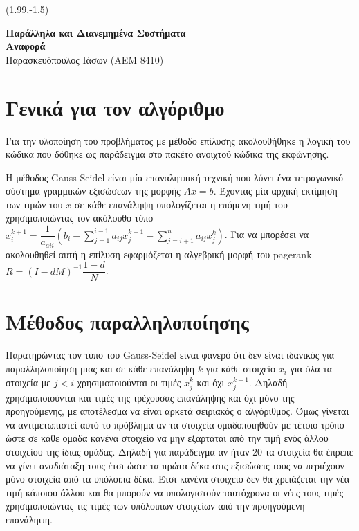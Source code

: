 \documentclass[10p]{report}
\begin{document}
\begin{textblock}{7.5}(1.99,-1.5)	
\begin{center}
\textbf{\Large{Παράλληλα και Διανεμημένα Συστήματα}}\\
\textbf{\large{Αναφορά }} \\
\normalsize{Παρασκευόπουλος Ιάσων (ΑΕΜ 8410)}
\end{center}
\end{textblock}

\section*{Γενικά για τον αλγόριθμο}

Για την υλοποίηση του προβλήματος  με μέθοδο επίλυσης 
ακολουθήθηκε η λογική του κώδικα που δόθηκε ως παράδειγμα στο πακέτο ανοιχτού
κώδικα της εκφώνησης. 

Η μέθοδος Gauss-Seidel είναι μία επαναλητπική τεχνική που λύνει ένα τετραγωνικό
σύστημα γραμμικών εξισώσεων της μορφής $ Ax=b $. Έχοντας μία αρχική εκτίμηση των τιμών
του $ x $ σε κάθε επανάληψη υπολογίζεται η επόμενη τιμή του χρησιμοποιώντας τον
ακόλουθο τύπο $ x_i^{k+1} = \dfrac{1}{a_{aii}}(b_i - \sum_{j=1}^{i-1} a_{ij}x_j^{k+1} - \sum_{j=i+1}^{n} a_{ij}x_j^k)$.
Για να μπορέσει να ακολουθηθεί αυτή η επίλυση
εφαρμόζεται η αλγεβρική μορφή του pagerank $ R = (I - dM)^{-1}\dfrac{1-d}{N} $. 

\section*{Μέθοδος παραλληλοποίησης}

Παρατηρώντας τον τύπο του Gauss-Seidel είναι φανερό ότι δεν είναι ιδανικός για
παραλληλοποίηση μιας και σε κάθε επανάληψη $ k $ για κάθε στοιχείο $ x_i $ για όλα τα
στοιχεία με $ j < i $ χρησιμοποιούνται οι τιμές $ x_j^{k}$ και όχι $ x_j^{k-1}$.
Δηλαδή χρησιμοποιούνται και τιμές της τρέχουσας επανάληψης και όχι μόνο της προηγούμενης, με αποτέλεσμα
να είναι αρκετά σειριακός ο αλγόριθμος. Όμως γίνεται να αντιμετωπιστεί αυτό το
πρόβλημα αν τα στοιχεία ομαδοποιηθούν με τέτοιο τρόπο ώστε σε κάθε ομάδα κανένα
στοιχείο να μην εξαρτάται από την τιμή ενός άλλου στοιχείου της ίδιας ομάδας.
Δηλαδή για παράδειγμα αν ήταν 20 τα στοιχεία θα έπρεπε να γίνει αναδιάταξη τους έτσι
ώστε τα πρώτα δέκα στις εξισώσεις τους να περιέχουν μόνο στοιχεία από τα υπόλοιπα
δέκα. Έτσι κανένα στοιχείο δεν θα χρειάζεται την νέα τιμή κάποιου άλλου και θα
μπορούν να υπολογιστούν ταυτόχρονα οι νέες τους τιμές χρησιμοποιώντας τις τιμές
των υπόλοιπων στοιχείων από την προηγούμενη επανάληψη.
\end{document}

